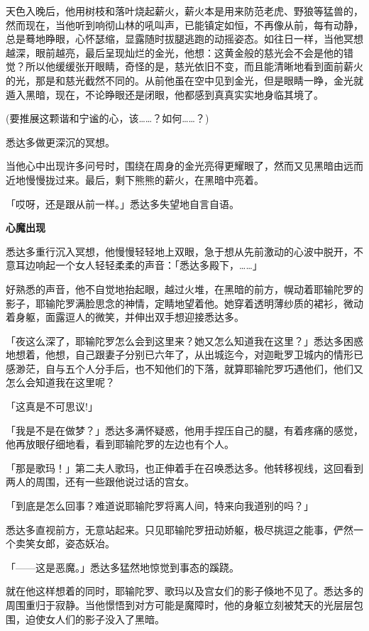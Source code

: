 \documentclass[12pt,twoside,openany]{book}
\newcommand{\mt}[1]{\textbullet \textbf{#1}}
\begin{document}
天色入晚后，他用树枝和落叶烧起薪火，薪火本是用来防范老虎、野狼等猛兽的，然而现在，当他听到响彻山林的吼叫声，已能镇定如恒，不再像从前，每有动静，总是蓦地睁眼，心怀瑟缩，显露随时拔腿逃跑的动摇姿态。如往日一样，当他冥想越深，眼前越亮，最后呈现灿烂的金光，他想：这黄金般的慈光会不会是他的错觉？所以他缓缓张开眼睛，奇怪的是，慈光依旧不变，而且能清晰地看到面前薪火的光，那是和慈光截然不同的。从前他虽在空中见到金光，但是眼睛一睁，金光就遁入黑暗，现在，不论睁眼还是闭眼，他都感到真真实实地身临其境了。

(要推展这颗谐和宁谧的心，该……？如何……？)

悉达多做更深沉的冥想。

当他心中出现许多问号时，围绕在周身的金光亮得更耀眼了，然而又见黑暗由远而近地慢慢拢过来。最后，剩下熊熊的薪火，在黑暗中亮着。

「哎呀，还是跟从前一样。」悉达多失望地自言自语。

\mt{心魔出现}

悉达多重行沉入冥想，他慢慢轻轻地上双眼，急于想从先前激动的心波中脱开，不意耳边响起一个女人轻轻柔柔的声音：「悉达多殿下，……」

好熟悉的声音，他不自觉地抬起眼，越过火堆，在黑暗的前方，幌动着耶输陀罗的影子，耶输陀罗满脸思念的神情，定睛地望着他。她穿着透明薄纱质的裙衫，微动着身躯，面露逗人的微笑，并伸出双手想迎接悉达多。

「夜这么深了，耶输陀罗怎么会到这里来？她又怎么知道我在这里？」悉达多困惑地想着，他想，自己跟妻子分别已六年了，从出城迄今，对迦毗罗卫城内的情形已感渺茫，自与五个人分手后，也不知他们的下落，就算耶输陀罗巧遇他们，他们又怎么会知道我在这里呢？

「这真是不可思议!」

「我是不是在做梦？」悉达多满怀疑惑，他用手捏压自己的腿，有着疼痛的感觉，他再放眼仔细地看，看到耶输陀罗的左边也有个人。

「那是歌玛！」第二夫人歌玛，也正伸着手在召唤悉达多。他转移视线，这回看到两人的周围，还有一些跟他说过话的宫女。

「到底是怎么回事？难道说耶输陀罗将离人间，特来向我道别的吗？」

悉达多直视前方，无意站起来。只见耶输陀罗扭动娇躯，极尽挑逗之能事，俨然一个卖笑女郎，姿态妖冶。

「——这是恶魔。」悉达多猛然地惊觉到事态的蹊跷。

就在他这样想着的同时，耶输陀罗、歌玛以及宫女们的影子倏地不见了。悉达多的周围重归于寂静。当他憬悟到对方可能是魔障时，他的身躯立刻被梵天的光层层包围，迫使女人们的影子没入了黑暗。
\end{document}
